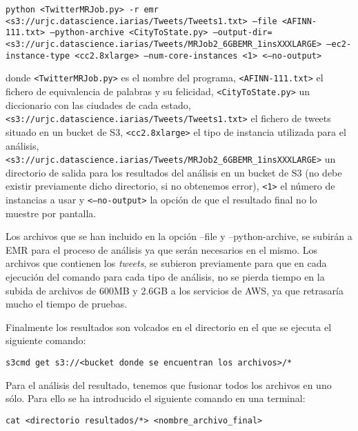 \documentclass[10pt, spanish]{article}
\begin{document}
\begin{appendices}
\begin{itemize}
\begin{itemize}
\begin{itemize}
\texttt{python <TwitterMRJob.py>\hspace{1mm} -r emr \newline <s3://urjc.datascience.iarias/Tweets/Tweets1.txt> \hspace{1mm}--file <AFINN-111.txt> \hspace{1mm} \newline--python-archive  <CityToState.py>\hspace{1mm} \newline--output-dir=<s3://urjc.datascience.iarias/Tweets/MRJob2\_6GBEMR\_1insXXXLARGE> \newline--ec2-instance-type <cc2.8xlarge>\hspace{1mm} --num-core-instances <1> \hspace{1mm}<--no-output>}

donde \texttt{<TwitterMRJob.py>} es el nombre del programa, \texttt{<AFINN-111.txt>} el fichero de equivalencia de palabras y su felicidad, \texttt{<CityToState.py>} un diccionario con las ciudades de cada estado, \texttt{<s3://urjc.datascience.iarias/Tweets/Tweets1.txt>} el fichero de tweets situado en un bucket de S3,  \texttt{<cc2.8xlarge>} el tipo de instancia utilizada para el análisis,
\texttt{<s3://urjc.datascience.iarias/Tweets/MRJob2\_6GBEMR\_1insXXXLARGE>} un directorio de salida para los resultados del análisis en un bucket de S3 (no debe existir previamente dicho directorio, si no obtenemos error), \texttt{<1>} el número de instancias a usar y \texttt{<--no-output>} la opción de que el resultado final no lo muestre por pantalla.

Los archivos que se han incluido en la opción --file y --python-archive, se subirán a EMR para el proceso de análisis ya que serán necesarios en el mismo. Los archivos que contienen los \textit{tweets}, se subieron previamente para que en cada ejecución del comando para cada tipo de análisis, no se pierda tiempo en la subida de archivos de 600MB y 2.6GB a los servicios de AWS, ya que retrasaría mucho el tiempo de pruebas.

Finalmente los resultados son volcados en el directorio en el que se ejecuta el siguiente comando:

\texttt{s3cmd get s3://<bucket donde se encuentran los archivos>/*}

Para el análisis del resultado, tenemos que fusionar todos los archivos en uno sólo. Para ello se ha introducido el siguiente comando en una terminal:

\texttt{cat <directorio resultados/*> \hspace{1mm}<nombre\_archivo\_final>}


\end{itemize}
\end{itemize}
\end{itemize}
\end{appendices}
\end{document}
